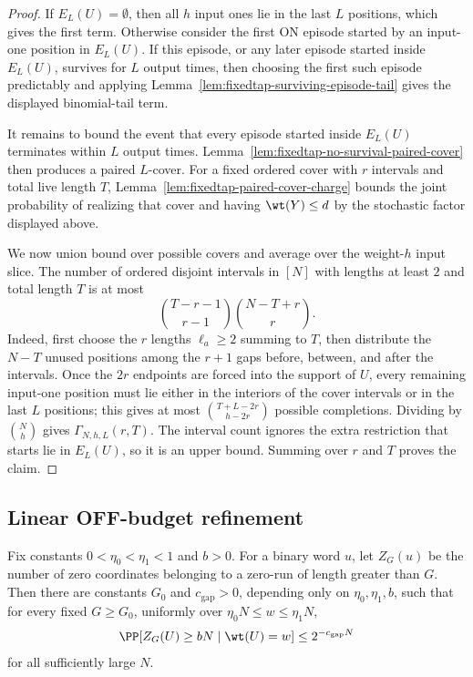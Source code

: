\begin{proof}
If \(E_L(U)=\emptyset\), then all \(h\) input ones lie in the last \(L\) positions, which gives the first term.
Otherwise consider the first ON episode started by an input-one position in \(E_L(U)\). If this episode, or any later
episode started inside \(E_L(U)\), survives for \(L\) output times, then choosing the first such episode predictably and
applying Lemma~\ref{lem:fixedtap-surviving-episode-tail} gives the displayed binomial-tail term.

It remains to bound the event that every episode started inside \(E_L(U)\) terminates within \(L\) output times.
Lemma~\ref{lem:fixedtap-no-survival-paired-cover} then produces a paired \(L\)-cover. For a fixed ordered cover with
\(r\) intervals and total live length \(T\), Lemma~\ref{lem:fixedtap-paired-cover-charge} bounds the joint probability
of realizing that cover and having \(\wt(Y)\le d\) by the stochastic factor displayed above.

We now union bound over possible covers and average over the weight-\(h\) input slice. The number of ordered disjoint
intervals in \([N]\) with lengths at least \(2\) and total length \(T\) is at most
\[
\binom{T-r-1}{r-1}\binom{N-T+r}{r}.
\]
Indeed, first choose the \(r\) lengths \(\ell_a\ge2\) summing to \(T\), then distribute the \(N-T\) unused positions
among the \(r+1\) gaps before, between, and after the intervals. Once the \(2r\) endpoints are forced into the support
of \(U\), every remaining input-one position must lie either in the interiors of the cover intervals or in the last
\(L\) positions; this gives at most \(\binom{T+L-2r}{h-2r}\) possible completions. Dividing by \(\binom{N}{h}\) gives
\(\Gamma_{N,h,L}(r,T)\). The interval count ignores the extra restriction that starts lie in \(E_L(U)\), so it is an
upper bound. Summing over \(r\) and \(T\) proves the claim.
\end{proof}


\subsection{Linear OFF-budget refinement}
\begin{lemma}
\label{lem:dense-long-gap-mass}
Fix constants \(0<\eta_0<\eta_1<1\) and \(b>0\). For a binary word \(u\), let \(Z_G(u)\) be the number of zero
coordinates belonging to a zero-run of length greater than \(G\). Then there are constants \(G_0\) and
\(c_{\mathrm{gap}}>0\), depending only on \(\eta_0,\eta_1,b\), such that for every fixed \(G\ge G_0\), uniformly over
\(\eta_0N\le w\le \eta_1N\),
\[
\PP[Z_G(U)\ge bN\mid \wt(U)=w]
\le
2^{-c_{\mathrm{gap}}N}
\]
for all sufficiently large \(N\).
\end{lemma}

